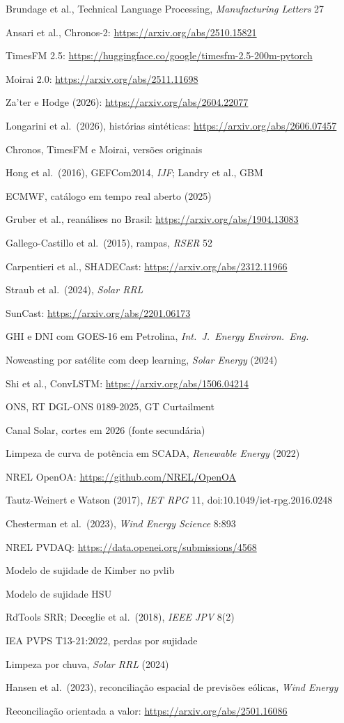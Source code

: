 {\begin{enumerate}[label={[\arabic*]},leftmargin=2.2em,itemsep=1pt]
\item Brundage et al., Technical Language Processing, \emph{Manufacturing Letters} 27
\item Ansari et al., Chronos-2: \url{https://arxiv.org/abs/2510.15821}
\item TimesFM 2.5: \url{https://huggingface.co/google/timesfm-2.5-200m-pytorch}
\item Moirai 2.0: \url{https://arxiv.org/abs/2511.11698}
\item Za'ter e Hodge (2026): \url{https://arxiv.org/abs/2604.22077}
\item Longarini et al.\ (2026), histórias sintéticas: \url{https://arxiv.org/abs/2606.07457}
\item Chronos, TimesFM e Moirai, versões originais
\item Hong et al.\ (2016), GEFCom2014, \emph{IJF}; Landry et al., GBM
\item ECMWF, catálogo em tempo real aberto (2025)
\item Gruber et al., reanálises no Brasil: \url{https://arxiv.org/abs/1904.13083}
\item Gallego-Castillo et al.\ (2015), rampas, \emph{RSER} 52
\item Carpentieri et al., SHADECast: \url{https://arxiv.org/abs/2312.11966}
\item Straub et al.\ (2024), \emph{Solar RRL}
\item SunCast: \url{https://arxiv.org/abs/2201.06173}
\item GHI e DNI com GOES-16 em Petrolina, \emph{Int.\ J.\ Energy Environ.\ Eng.}
\item Nowcasting por satélite com deep learning, \emph{Solar Energy} (2024)
\item Shi et al., ConvLSTM: \url{https://arxiv.org/abs/1506.04214}
\item ONS, RT DGL-ONS 0189-2025, GT Curtailment
\item Canal Solar, cortes em 2026 (fonte secundária)
\item Limpeza de curva de potência em SCADA, \emph{Renewable Energy} (2022)
\item NREL OpenOA: \url{https://github.com/NREL/OpenOA}
\item Tautz-Weinert e Watson (2017), \emph{IET RPG} 11, doi:10.1049/iet-rpg.2016.0248
\item Chesterman et al.\ (2023), \emph{Wind Energy Science} 8:893
\item NREL PVDAQ: \url{https://data.openei.org/submissions/4568}
\item Modelo de sujidade de Kimber no pvlib
\item Modelo de sujidade HSU
\item RdTools SRR; Deceglie et al.\ (2018), \emph{IEEE JPV} 8(2)
\item IEA PVPS T13-21:2022, perdas por sujidade
\item Limpeza por chuva, \emph{Solar RRL} (2024)
\item Hansen et al.\ (2023), reconciliação espacial de previsões eólicas, \emph{Wind Energy}
\item Reconciliação orientada a valor: \url{https://arxiv.org/abs/2501.16086}
\end{enumerate}}
